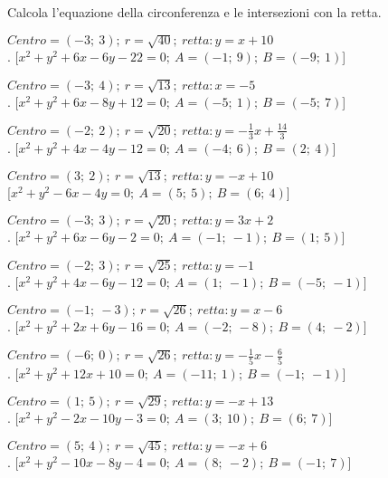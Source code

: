 \newpage

\begin{esercizio}\label{ese:}
 Calcola l'equazione della circonferenza e le intersezioni con la retta.
 \begin{enumeratea}
  \item  \(Centro=\left (-3;~3 \right );~r = \sqrt{40};~retta: y = x +10\)\\
   . \hfill [\(x^2 + y^2 +6x -6y -22 = 0;~A = \left (-1;~9 \right );~B = 
\left (-9;~1 \right )\)]
  \item  \(Centro=\left (-3;~4 \right );~r = \sqrt{13};~retta: x = -5\)\\
  .  \hfill [\(x^2 + y^2 +6x -8y +12 = 0;~A = \left (-5;~1 \right );~B = 
\left (-5;~7 \right )\)]
  \item  \(Centro=\left (-2;~2 \right );~r = \sqrt{20};~retta: y = 
-\frac{1}{3} x +\frac{14}{3}\)\\
  .  \hfill [\(x^2 + y^2 +4x -4y -12 = 0;~A = \left (-4;~6 \right );~B = 
\left (2;~4 \right )\)]
  \item  \(Centro=\left (3;~2 \right );~r = \sqrt{13};~retta: y = - x +10\)\\
   \hfill [\(x^2 + y^2 -6x -4y  = 0;~A = \left (5;~5 \right );~B = \left (6;~4 
\right )\)]
  \item  \(Centro=\left (-3;~3 \right );~r = \sqrt{20};~retta: y = 3 x +2\)\\
  .  \hfill [\(x^2 + y^2 +6x -6y -2 = 0;~A = \left (-1;~-1 \right );~B = 
\left (1;~5 \right )\)]
  \item  \(Centro=\left (-2;~3 \right );~r = \sqrt{25};~retta: y = -1\)\\
  .  \hfill [\(x^2 + y^2 +4x -6y -12 = 0;~A = \left (1;~-1 \right );~B = 
\left (-5;~-1 \right )\)]
  \item  \(Centro=\left (-1;~-3 \right );~r = \sqrt{26};~retta: y = x -6\)\\
  .  \hfill [\(x^2 + y^2 +2x +6y -16 = 0;~A = \left (-2;~-8 \right );~B = 
\left (4;~-2 \right )\)]
  \item  \(Centro=\left (-6;~0 \right );~r = \sqrt{26};~retta: y = 
-\frac{1}{5} x -\frac{6}{5}\)\\
  .  \hfill [\(x^2 + y^2 +12x +10 = 0;~A = \left (-11;~1 \right );~B = \left 
(-1;~-1 \right )\)]
  \item  \(Centro=\left (1;~5 \right );~r = \sqrt{29};~retta: y = - x +13\)\\
  .  \hfill [\(x^2 + y^2 -2x -10y -3 = 0;~A = \left (3;~10 \right );~B = 
\left (6;~7 \right )\)]
  \item  \(Centro=\left (5;~4 \right );~r = \sqrt{45};~retta: y = - x +6\)\\
   . \hfill [\(x^2 + y^2 -10x -8y -4 = 0;~A = \left (8;~-2 \right );~B = 
\left (-1;~7 \right )\)]
 \end{enumeratea}
\end{esercizio}



